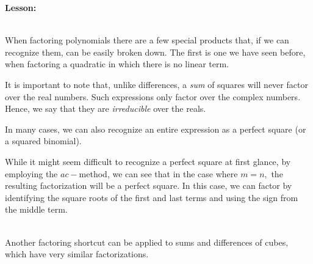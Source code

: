 \documentclass[12pt]{article}
\theoremstyle{definition}
\begin{document}
{\bf Lesson:}\\
\ \par
When factoring polynomials there are a few special products that, if we can recognize them, can be easily broken down. The first is one we have seen before, when factoring a quadratic in which there is no linear term.
\begin{center}
\end{center}
It is important to note that, unlike differences, a {\it sum} of squares will never factor over the real numbers.  Such expressions only factor over the complex numbers.  Hence, we say that they are {\it irreducible} over the reals.
\begin{center}
\end{center}
In many cases, we can also recognize an entire expression as a perfect square (or a squared binomial).
\begin{center}
\end{center}
While it might seem difficult to recognize a perfect square at first glance, by employing the $ac-$method, we can see that in the case where $m=n,$ the resulting factorization will be a perfect square. In this case, we can factor by identifying the square roots of the first and last
terms and using the sign from the middle term.\\
\ \par
Another factoring shortcut can be applied to sums and differences of cubes, which have very similar
factorizations.
\begin{center}
\end{center}
\end{document}
